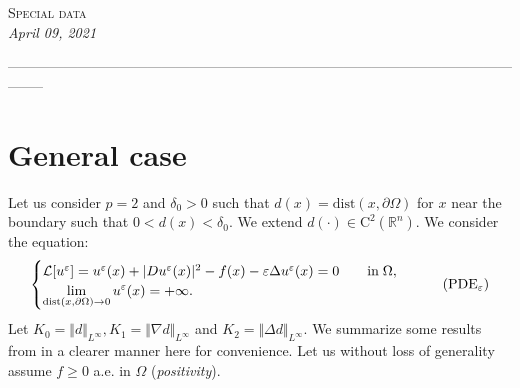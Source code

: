 \documentclass[10pt]{article}
\newcommand{\setfont}[2]{{\fontfamily{#1}\selectfont #2}}
\theoremstyle{plain}
\theoremstyle{remark}
\begin{document}
\begin{center}
{\LARGE \textsc{Special data}}\\
{\textit{April 09, 2021}}
\end{center}



\begin{center}
--------------------------------------------------------------------------------------------------------------------
\end{center}


\section{General case}
Let us consider $p = 2$ and $\delta_0>0$ such that $d(x) = \mathrm{dist}(x,\partial\Omega)$ for $x$ near the boundary such that $0<d(x)<\delta_0$. We extend $d(\cdot)\in \mathrm{C}^2(\mathbb{R}^n)$. We consider the equation:
\begin{equation}\label{eq:PDEeps}
    \begin{cases}
   \mathcal{L}[u^\varepsilon] =  u^\varepsilon(x) + |Du^\varepsilon(x)|^2 - f(x) - \varepsilon \Delta u^\varepsilon(x) = 0 \qquad
    \text{in}\;\Omega, \vspace{0cm}\\
    \displaystyle  \lim_{\mathrm{dist}(x,\partial \Omega)\to 0} u^\varepsilon(x) = +\infty.
    \end{cases} \tag{PDE$_\varepsilon$}
\end{equation}
Let $K_0 = \Vert d\Vert_{L^\infty}, K_1 = \Vert\nabla d\Vert_{L^\infty}$ and $K_2 = \Vert \Delta d\Vert_{L^\infty}$. We summarize some results from \cite{Lasry1989} in a clearer manner here for convenience. Let us without loss of generality assume $f\geq 0$ a.e. in $\Omega$ (\textit{positivity}). 
\end{document}
